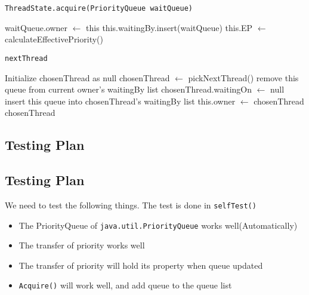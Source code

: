 \documentclass{article}
\begin{document}
\begin{spacing}{1.1}
\begin{algorithm}[htbp]
  \caption{\texttt{ThreadState.acquire(PriorityQueue waitQueue)}}
\begin{algorithmic}[1]
  \STATE waitQueue.owner $\leftarrow$ this
  \STATE this.waitingBy.insert(waitQueue)
  \STATE this.EP $\leftarrow$ calculateEffectivePriority()  
\RETURN
\end{algorithmic}
\end{algorithm}

\begin{algorithm}[htbp]
  \caption{\texttt{nextThread}}
\begin{algorithmic}[1]
  \STATE Initialize chosenThread as null
  \STATE chosenThread $\leftarrow$ pickNextThread()
    \STATE remove this queue from current owner's waitingBy list
    \STATE chosenThread.waitingOn $\leftarrow$ null
    \STATE insert this queue into chosenThread's waitingBy list
  \ENDIF
  \STATE this.owner $\leftarrow$ chosenThread
\RETURN chosenThread
\end{algorithmic}
\end{algorithm}

\subsection{Testing Plan}
\subsection{Testing Plan}
We need to test the following things. The test is done in \texttt{selfTest()}
\begin{itemize}
\item The PriorityQueue of \texttt{java.util.PriorityQueue} works well(Automatically)
\item The transfer of priority works well
\item The transfer of priority will hold its property when queue updated
\item \texttt{Acquire()} will work well, and add queue to the queue list
\end{itemize}


\end{spacing}
\end{document}
